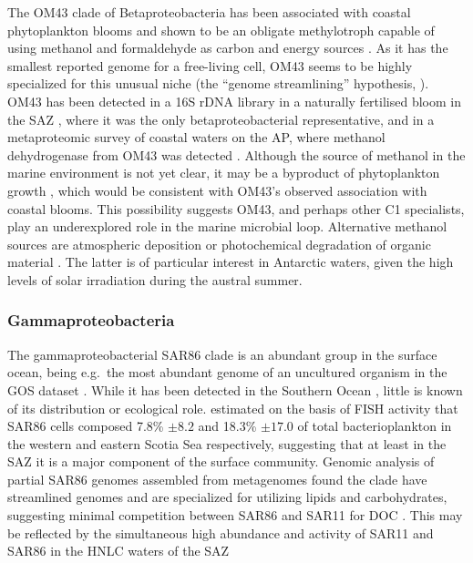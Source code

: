 The OM43 clade of Betaproteobacteria has been associated with coastal phytoplankton blooms \cite{Morris:2006hma} and shown to be an obligate methylotroph capable of using methanol and formaldehyde as carbon and energy sources \cite{Giovannoni:2008kw}.
As it has the smallest reported genome for a free-living cell, OM43 seems to be highly specialized for this unusual niche (the ``genome streamlining'' hypothesis, \citet{Mira:2001ti}).
OM43 has been detected in a 16S rDNA library in a naturally fertilised bloom in the \ac{SAZ} \cite{West:2008kc}, where it was the only betaproteobacterial representative, and in a metaproteomic survey of coastal waters on the \ac{AP}, where methanol dehydrogenase from OM43 was detected \cite{Williams:2012bs}.
Although the source of methanol in the marine environment is not yet clear, it may be a byproduct of phytoplankton growth \cite{Heikes:2002ee}, which would be consistent with OM43's observed association with coastal blooms.
This possibility suggests OM43, and perhaps other C1 specialists, play an underexplored role in the marine microbial loop.
Alternative methanol sources are atmospheric deposition \cite{Sinha:2007uu} or photochemical degradation of organic material \cite{Dixon:2011er}.
The latter is of particular interest in Antarctic waters, given the high levels of solar irradiation during the austral summer.

\subsubsection{Gammaproteobacteria}


The gammaproteobacterial SAR86 clade is an abundant group in the surface ocean, being e.g.\ the most abundant genome of an uncultured organism in the \ac{GOS} dataset \cite{Dupont:2011fk}.
While it has been detected in the Southern Ocean \cite{Abell:2005ji,Topping:2006ul,West:2008kc,Obernosterer:2011df}, little is known of its distribution or ecological role.
\cite{Topping:2006ul} estimated on the basis of \ac{FISH} activity that SAR86 cells composed 7.8\% $\pm8.2$ and 18.3\% $\pm17.0$ of total bacterioplankton in the western and eastern Scotia Sea respectively, suggesting that at least in the SAZ it is a major component of the surface community.
Genomic analysis of partial SAR86 genomes assembled from metagenomes found the clade have streamlined genomes and are specialized for utilizing lipids and carbohydrates, suggesting minimal competition between SAR86 and SAR11 for \ac{DOC} \cite{Dupont:2011fk}.
This may be reflected by the simultaneous high abundance and activity of SAR11 and SAR86 in the \ac{HNLC} waters of the \ac{SAZ} \cite{Obernosterer:2011df}

